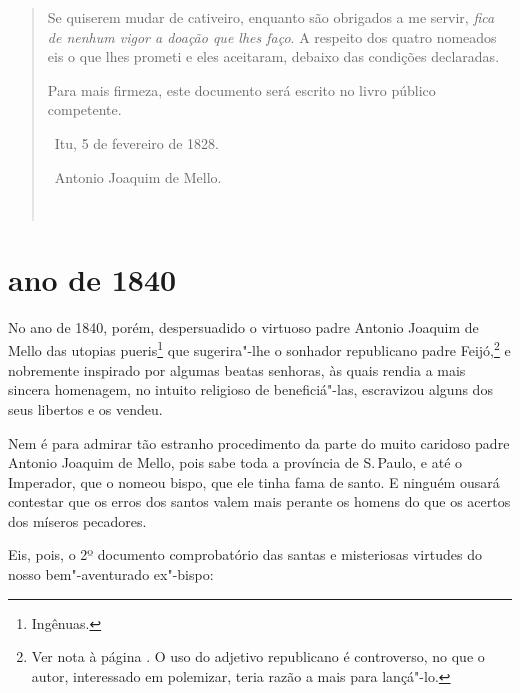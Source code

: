\begin{quote}
Se quiserem mudar de cativeiro, enquanto são obrigados a me servir,
\emph{fica de nenhum vigor a doação que lhes faço}. A respeito dos
quatro nomeados eis o que lhes prometi e eles aceitaram, debaixo das
condições declaradas.

Para mais firmeza, este documento será escrito no livro público
competente.

\hfill\ Itu, 5 de fevereiro de 1828.\smallskip

\hfill\ Antonio Joaquim de Mello.

\noindent\ 
\end{quote}


\section*{ano de 1840}

No ano de 1840, porém, despersuadido o virtuoso padre Antonio Joaquim de
Mello das utopias pueris\footnote{Ingênuas.} que sugerira"-lhe o
sonhador republicano padre Feijó,\footnote{Ver nota à página \pageref{feijo}. O uso do
  adjetivo republicano é controverso, no que o autor, interessado em
  polemizar, teria razão a mais para lançá"-lo.} e nobremente inspirado
por algumas beatas senhoras, às quais rendia a mais sincera homenagem,
no intuito religioso de beneficiá"-las, escravizou alguns dos seus
libertos e os vendeu.

Nem é para admirar tão estranho procedimento da parte do muito caridoso
padre Antonio Joaquim de Mello, pois sabe toda a província de S.\,Paulo,
e até o Imperador, que o nomeou bispo, que ele tinha fama de santo. E
ninguém ousará contestar que os erros dos santos valem mais perante os
homens do que os acertos dos míseros pecadores.

Eis, pois, o 2º documento comprobatório das santas e misteriosas
virtudes do nosso bem"-aventurado ex"-bispo:

